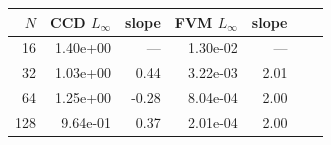 \begin{tabular}{rrrrrrr}
\toprule
$N$ & CCD $L_\infty$ & slope & FVM $L_\infty$ & slope \\
\midrule
16 & 1.40e+00 & --- & 1.30e-02 & --- \\
32 & 1.03e+00 & 0.44 & 3.22e-03 & 2.01 \\
64 & 1.25e+00 & -0.28 & 8.04e-04 & 2.00 \\
128 & 9.64e-01 & 0.37 & 2.01e-04 & 2.00 \\
\bottomrule
\end{tabular}
